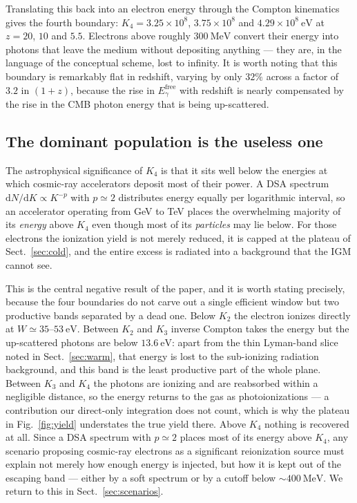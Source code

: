 \documentclass[twocolumn]{article}
\begin{document}
Translating this back into an electron energy through the Compton kinematics
gives the fourth boundary: $K_4 = 3.25\times10^{8}$, $3.75\times10^{8}$ and
$4.29\times10^{8}\ \mathrm{eV}$ at $z = 20$, $10$ and $5.5$. Electrons above
roughly $300\ \mathrm{MeV}$ convert their energy into photons that leave the
medium without depositing anything --- they are, in the language of the
conceptual scheme, lost to infinity. It is worth noting that this boundary is
remarkably flat in redshift, varying by only $32\%$ across a factor of $3.2$ in
$(1+z)$, because the rise in $E_\gamma^{\mathrm{free}}$ with redshift is nearly
compensated by the rise in the CMB photon energy that is being up-scattered.

\subsection{The dominant population is the useless one}

The astrophysical significance of $K_4$ is that it sits well below the energies
at which cosmic-ray accelerators deposit most of their power. A DSA spectrum
$\mathrm{d}N/\mathrm{d}K \propto K^{-p}$ with $p \simeq 2$
\citep{Park2015,Ruszkowski2023} distributes energy equally per logarithmic
interval, so an accelerator operating from GeV to TeV places the overwhelming
majority of its \emph{energy} above $K_4$ even though most of its
\emph{particles} may lie below. For those electrons the ionization yield is not
merely reduced, it is capped at the plateau of Sect.~\ref{sec:cold},
and the entire excess is radiated into a background that the IGM cannot see.

This is the central negative result of the paper, and it is worth stating
precisely, because the four boundaries do not carve out a single efficient
window but two productive bands separated by a dead one. Below $K_2$ the
electron ionizes directly at $W \simeq 35$--$53\ \mathrm{eV}$. Between
$K_2$ and $K_3$ inverse Compton takes the energy but the up-scattered photons
are below $13.6\ \mathrm{eV}$: apart from the thin Lyman-band slice noted in
Sect.~\ref{sec:warm}, that energy is lost to the sub-ionizing radiation
background, and this band is the least productive part of the whole plane.
Between $K_3$ and $K_4$ the photons are ionizing and are reabsorbed within a
negligible distance, so the energy returns to the gas as photoionizations ---
a contribution our direct-only integration does not count, which is why the
plateau in Fig.~\ref{fig:yield} understates the true yield there. Above $K_4$
nothing is recovered at all. Since a DSA spectrum with $p \simeq 2$ places most
of its energy above $K_4$, any scenario proposing cosmic-ray electrons as a significant reionization
source must explain not merely how enough energy is injected, but how it is
kept out of the escaping band --- either by a soft spectrum or by a cutoff
below $\sim\!400\ \mathrm{MeV}$. We return to this in
Sect.~\ref{sec:scenarios}.
\end{document}
